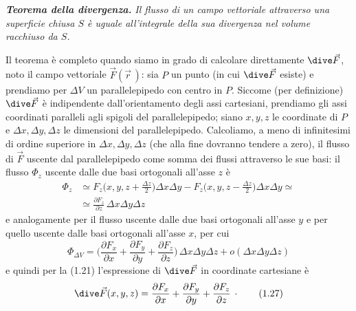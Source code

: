 \textbf{\textit{Teorema della divergenza.}} \textit{Il flusso di un campo vettoriale attraverso una superficie chiusa $S$ è uguale all'integrale della sua divergenza nel volume racchiuso da $S$.}

Il teorema è completo quando siamo in grado di calcolare direttamente $\dive\vec F$, noto il campo vettoriale $\vec F(\vec r\,)$: sia $P$ un punto (in cui $\dive\vec F$ esiste) e prendiamo per $\Delta V$ un parallelepipedo con centro in $P$. Siccome (per definizione) $\dive\vec F$ è indipendente dall'orientamento degli assi cartesiani, prendiamo gli assi coordinati paralleli agli spigoli del parallelepipedo; siano $x,y,z$ le coordinate di $P$ e $\Delta x,\Delta y,\Delta z$ le dimensioni del parallelepipedo. Calcoliamo, a meno di infinitesimi di ordine superiore in $\Delta x,\Delta y,\Delta z$ (che alla fine dovranno tendere a zero), il flusso di $\vec F$ uscente dal parallelepipedo come somma dei flussi attraverso le sue basi: il flusso $\Phi_z$ uscente dalle due basi ortogonali all'asse $z$ è
\begin{equation}
\begin{split}
\Phi_z&\simeq F_z\Big(x,y,z+\frac{\Delta z}{2}\Big)\Delta x\Delta y-F_z\Big(x,y,z-\frac{\Delta z}{2}\Big)\Delta x\Delta y\simeq\\
&\simeq\frac{\partial F_z}{\partial z}\,\Delta x\Delta y\Delta z
\end{split}
\tag{1.25}
\end{equation}
e analogamente per il flusso uscente dalle due basi ortogonali all'asse $y$ e per quello uscente dalle basi ortogonali all'asse $x$, per cui
\begin{equation}
\Phi_{\Delta V}=\Big(\frac{\partial F_x}{\partial x}+\frac{\partial F_y}{\partial y}+\frac{\partial F_z}{\partial z}\Big)\,\Delta x\Delta y\Delta z+o(\Delta x\Delta y\Delta z)
\tag{1.26}
\end{equation}
e quindi per la (1.21) l'espressione di $\dive\vec F$ in coordinate cartesiane è
\begin{equation}
\dive\vec F(x,y,z)=\frac{\partial F_x}{\partial x}+\frac{\partial F_y}{\partial y}+\frac{\partial F_z}{\partial z}\,\cdot
\tag{1.27}
\end{equation}

